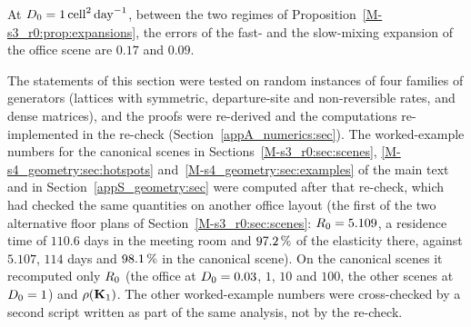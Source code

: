 At $D_0=1\,\mathrm{cell}^2\,\mathrm{day}^{-1}$, between the two regimes of Proposition~\ref{M-s3_r0:prop:expansions}, the errors of the fast- and
the slow-mixing expansion of the office scene are $0.17$ and $0.09$.

The statements of this section were tested on random instances of four families of generators (lattices with
symmetric, departure-site and non-reversible rates, and dense matrices), and the proofs were re-derived and the
computations re-implemented in the re-check (Section~\ref{appA_numerics:sec}). The worked-example numbers for the
canonical scenes in Sections~\ref{M-s3_r0:sec:scenes}, \ref{M-s4_geometry:sec:hotspots} and~\ref{M-s4_geometry:sec:examples}
of the main text and in Section~\ref{appS_geometry:sec} were computed after that re-check, which had checked the
same quantities on another office layout (the first of the two alternative floor plans of
Section~\ref{M-s3_r0:sec:scenes}: $R_0=5.109$, a residence time of $110.6$ days in the meeting room and $97.2\,\%$ of
the elasticity there, against $5.107$, $114$ days and $98.1\,\%$ in the canonical scene). On the canonical scenes it
recomputed only $R_0$ (the office at $D_0=0.03$, $1$, $10$ and $100$, the other scenes at $D_0=1$) and
$\rho(\mathbf{K}_1)$. The other worked-example numbers were cross-checked by a second script written as part of the
same analysis, not by the re-check.
